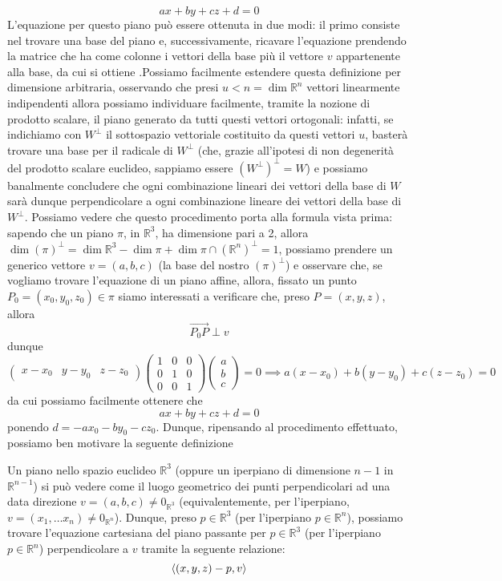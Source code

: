 \documentclass[openany]{book}
\begin{document}
$$
ax + by + cz + d = 0
$$
L'equazione per questo piano può essere ottenuta in due modi: il primo consiste nel trovare una base del piano e, successivamente, ricavare l'equazione prendendo la matrice che ha come colonne i vettori della base più il vettore $v$ appartenente alla base, da cui si ottiene .Possiamo facilmente estendere questa definizione per dimensione arbitraria, osservando che presi $u < n = \dim{\mathbb{R}^n}$ vettori linearmente indipendenti allora possiamo individuare facilmente, tramite la nozione di prodotto scalare, il piano generato da tutti questi vettori ortogonali: infatti, se indichiamo con $W^{\perp}$ il sottospazio vettoriale costituito da questi vettori $u$, basterà trovare una base per il radicale di $W^{\perp}$ (che, grazie all'ipotesi di non degenerità del prodotto scalare euclideo, sappiamo essere $(W^{\perp})^{\perp} = W$) e possiamo banalmente concludere che ogni combinazione lineari dei vettori della base di $W$ sarà dunque perpendicolare a ogni combinazione lineare dei vettori della base di $W^{\perp}$. Possiamo vedere che questo procedimento porta alla formula vista prima: sapendo che un piano $\pi$, in $\mathbb{R}^3$, ha dimensione pari a 2, allora $\dim{(\pi)^{\perp}} = \dim{\mathbb{R}^3} - \dim{\pi} + \dim{\pi \cap (\mathbb{R}^n)^{\perp}} = 1$, possiamo prendere un generico vettore $v = (a, b, c)$ (la base del nostro $(\pi)^{\perp}$) e osservare che, se vogliamo trovare l'equazione di un piano affine, allora, fissato un punto $P_0 = (x_0, y_0, z_0) \in \pi$ siamo interessati a verificare che, preso $P = (x, y, z)$, allora
$$
\vec{P_0P} \perp v
$$
dunque
$$
\begin{pmatrix}
	x - x_0 & y-y_0 & z-z_0
\end{pmatrix} \begin{pmatrix}
1 & 0 & 0 \\
0 & 1 & 0 \\
0 & 0 & 1
\end{pmatrix} \begin{pmatrix}
a \\
b \\
c
\end{pmatrix} = 0 \implies
a(x-x_0) + b(y-y_0) + c(z-z_0) = 0
$$
da cui possiamo facilmente ottenere che
$$
ax+by +cz + d  = 0
$$
ponendo $d = - ax_0 - by_0 - cz_0$. Dunque, ripensando al procedimento effettuato, possiamo ben motivare la seguente definizione
\begin{definition}
Un piano nello spazio euclideo $\mathbb{R}^3$ (oppure un iperpiano di dimensione $n-1$ in $\mathbb{R}^{n-1}$) si può vedere come il luogo geometrico dei punti perpendicolari ad una data direzione $v = (a, b, c) \neq 0_{\mathbb{R}^3}$ (equivalentemente, per l'iperpiano, $v=(x_1, \ldots x_n) \neq 0_{\mathbb{R}^n}$). Dunque, preso $p \in \mathbb{R}^3$ (per l'iperpiano $p \in \mathbb{R}^n$), possiamo trovare l'equazione cartesiana del piano passante per $p \in \mathbb{R}^3$ (per l'iperpiano $p \in \mathbb{R}^n$) perpendicolare a $v$ tramite la seguente relazione:
\begin{equation}
\langle (x, y, z) - p, v \rangle
\end{equation}
\label{def:iperpiano}
\end{definition}
\end{document}
